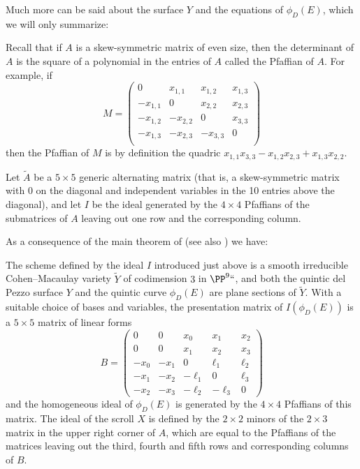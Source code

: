 Much more can be said about the surface $Y$ and the equations of $\phi_D(E)$, which we will only summarize:

\begin{fact}
Recall that if $A$ is a skew-symmetric matrix of even size,
then the determinant of $A$ is the square of a polynomial in the entries of $A$ called the Pfaffian of $A$. For example, if
%
$$
M = \begin{pmatrix}
0&x_{1,1}&x_{1,2}&x_{1,3}\\
-x_{1,1}&0&x_{2,2}&x_{2,3}\\
-x_{1,2}&-x_{2,2}&0&x_{3,3}\\
-x_{1,3}&-x_{2,3}&-x_{3,3}&0\\
\end{pmatrix}
$$
then the Pfaffian of $M$ is by definition the quadric $x_{1,1}x_{3,3}-x_{1,2}x_{2,3}+x_{1,3}x_{2,2}$.

Let $\tilde A$ be a $5\times 5$ generic alternating matrix (that is, a skew-symmetric matrix with 0 on the diagonal and independent variables
in the 10 entries above the diagonal), and let $I$ be the ideal
generated by the $4\times 4$ Pfaffians of
the submatrices of $A$ leaving out one row and the corresponding column.

\hskip-1pt As a consequence of the main theorem of  \cite{MR453723}
(see also \cite[Theorem 11]{Eisenbud1995}) we have:

\begin{proposition} \label{5x5 Pfaffians}
The scheme defined by
the ideal
$I$ introduced just above
is a smooth irreducible Cohen--Macaulay variety $\tilde Y$ of codimension
$3$ in $\PP^9` `$,
and both the quintic del Pezzo surface $Y$ and the quintic curve $\phi_D(E)$ are plane sections of $\tilde Y$.
With a suitable choice of bases and variables,  the presentation
matrix of $I(\phi_D(E))$ is
a $5\times 5$ matrix of linear forms
$$
B =\begin{pmatrix}
0&0&x_0&x_1&x_2\\
0&0&x_1&x_2&x_3\\
-x_0&-x_1&0&\ell_1&\ell_2\\
-x_1&-x_2&-\ell_1&0&\ell_3\\
-x_2&-x_3&-\ell_2&-\ell_3&0
\end{pmatrix}
$$
and
the homogeneous ideal of $\phi_D(E)$ is generated by the  $4\times 4$ Pfaffians of this matrix. The ideal of
the scroll $X$ is defined by the $2\times 2$ minors of the $2\times 3$ matrix in the upper right corner of $A$, which
are equal to the Pfaffians of the matrices leaving out the
third, fourth and fifth
rows
and corresponding columns of $B$.
\vspace*{-1.4\baselineskip}
\end{proposition}
\end{fact}

